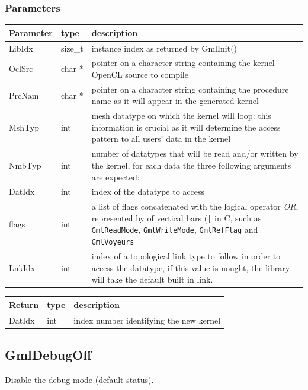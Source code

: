 \documentclass[a4paper,12pt]{article}
\begin{document}
\subsubsection*{Parameters}

\begin{tabular}{|m{2cm}|m{1.5cm}|m{10.5cm}|}
\hline
Parameter  & type    & description \\
\hline
LibIdx     & size\_t & instance index as returned by GmlInit() \\
\hline
OclSrc     & char *  & pointer on a character string containing the kernel OpenCL source to compile \\
\hline
PrcNam     & char *  & pointer on a character string containing the procedure name as it will appear in the generated kernel \\
\hline
MshTyp     & int     & mesh datatype on which the kernel will loop: this information is crucial as it will determine the access pattern to all users’ data in the kernel \\
\hline
NmbTyp     & int     & number of datatypes that will be read and/or written by the kernel, for each data the three following arguments are expected: \\
\hline
DatIdx     & int     & index of the datatype to access \\
\hline
flags      & int     & a list of flags concatenated with the logical operator \emph{OR}, represented by of vertical bars ({\tt |} in C, such as {\tt GmlReadMode}, {\tt GmlWriteMode}, {\tt GmlRefFlag} and {\tt GmlVoyeurs} \\
\hline
LnkIdx     & int     & index of a topological link type to follow in order to access the datatype, if this value is nought, the library will take the default built in link. \\
\hline
\end{tabular}

\medskip

\begin{tabular}{|m{2cm}|m{1.5cm}|m{10.5cm}|}
\hline
Return     & type   & description \\
\hline
DatIdx     & int    & index number identifying the new kernel \\
\hline
\end{tabular}


\subsection{GmlDebugOff}
Disable the debug mode (default status).
\end{document}
